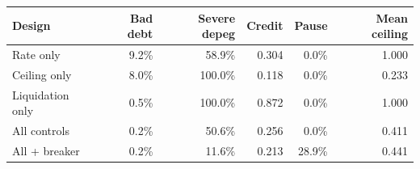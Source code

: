 \begin{tabular}{lrrrrr}
\toprule
Design & Bad debt & Severe depeg & Credit & Pause & Mean ceiling \\
\midrule
Rate only & 9.2\% & 58.9\% & 0.304 & 0.0\% & 1.000 \\
Ceiling only & 8.0\% & 100.0\% & 0.118 & 0.0\% & 0.233 \\
Liquidation only & 0.5\% & 100.0\% & 0.872 & 0.0\% & 1.000 \\
All controls & 0.2\% & 50.6\% & 0.256 & 0.0\% & 0.411 \\
All + breaker & 0.2\% & 11.6\% & 0.213 & 28.9\% & 0.441 \\
\bottomrule
\end{tabular}
